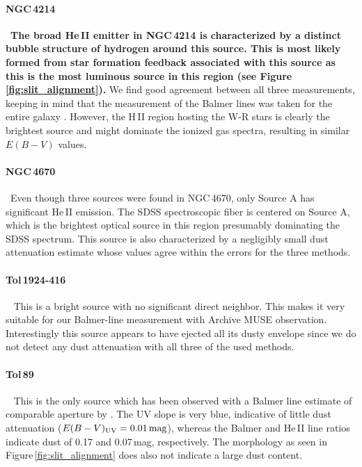 \documentclass[linenumbers]{aastex63}
\begin{document}
\paragraph{NGC\,4214~}~\textbf{The broad He\,II emitter in NGC\,4214 is characterized by a distinct bubble structure of hydrogen around this source. This is most likely formed from star formation feedback associated with this source as this is the most luminous source in this region (see Figure\,\ref{fig:slit_alignment}). }
We find good agreement between all three measurements, keeping in mind that the measurement of the Balmer lines was taken for the entire galaxy \citep{moustakas_integrated_2006}. However, the H\,II region hosting the W-R stars is clearly the brightest source and might dominate the ionized gas spectra, resulting in similar $E(B-V)$ values.

\paragraph{NGC\,4670~}~Even though three sources were found in NGC\,4670, only Source A has significant He\,II emission. The SDSS spectroscopic fiber is centered on Source A, which is the brightest optical source in this region presumably dominating the SDSS spectrum. This source is also characterized by a negligibly small dust attenuation estimate whose values agree within the errors for the three methods. 

\paragraph{Tol\,1924-416~}~
This is a bright source with no significant direct neighbor. This makes it very suitable for our Balmer-line measurement with Archive MUSE observation. Interestingly this source appears to have ejected all its dusty envelope since we do not detect any dust attenuation with all three of the used methods.

\paragraph{Tol\,89~}~
This is the only source which has been observed with a Balmer line estimate of comparable aperture by \citet{sidoli_massive_2006}. 
The UV slope is very blue, indicative of little dust attenuation ($E(B-V){\rm _{UV} = 0.01\,mag}$), whereas the Balmer and He\,II line ratios indicate dust of 0.17 and 0.07\,mag, respectively. The morphology as seen in Figure\,\ref{fig:slit_alignment} does also not indicate a large dust content.
\end{document}
